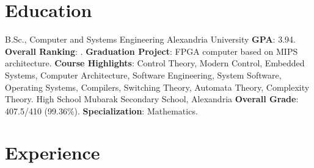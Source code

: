 \documentclass[letterpaper]{twentysecondcv} %
\begin{document}



\makeprofile


\section{Education}

\begin{twenty} %
               {B.Sc., Computer and Systems Engineering}
               {Alexandria University}
               {\textbf{GPA}: 3.94.\newline
                \textbf{Overall Ranking}: \underline{}.\newline
                \textbf{Graduation Project}: FPGA computer based on MIPS architecture.\newline
                \textbf{Course Highlights}: Control Theory, Modern Control, Embedded Systems,
                                            Computer Architecture, Software Engineering,
                                            System Software, Operating Systems, Compilers, Switching Theory,
                                            Automata Theory, Complexity Theory.
               }
               {High School}
               {Mubarak Secondary School, Alexandria}
               {\textbf{Overall Grade}: 407.5/410 (99.36\%).\newline
                \textbf{Specialization}: Mathematics.}
\end{twenty}


\section{Experience}
\end{document}
